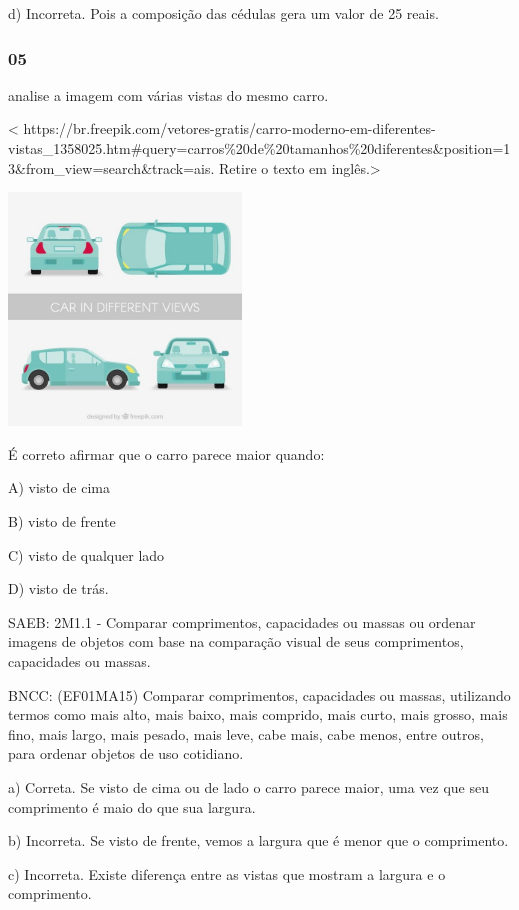 d) Incorreta. Pois a composição das cédulas gera um valor de 25 reais.

\subsubsection{05}\label{section-121}

analise a imagem com várias vistas do mesmo carro.

\textless{}
https://br.freepik.com/vetores-gratis/carro-moderno-em-diferentes-vistas\_1358025.htm\#query=carros\%20de\%20tamanhos\%20diferentes\&position=13\&from\_view=search\&track=ais.
Retire o texto em inglês.\textgreater{}

\includegraphics[width=2.43750in,height=2.43750in]{media/image146.jpg}

É correto afirmar que o carro parece maior quando:

A) visto de cima

B) visto de frente

C) visto de qualquer lado

D) visto de trás.

SAEB: 2M1.1 - Comparar comprimentos, capacidades ou massas ou ordenar
imagens de objetos com base na comparação visual de seus comprimentos,
capacidades ou massas.

BNCC: (EF01MA15) Comparar comprimentos, capacidades ou massas,
utilizando termos como mais alto, mais baixo, mais comprido, mais curto,
mais grosso, mais fino, mais largo, mais pesado, mais leve, cabe mais,
cabe menos, entre outros, para ordenar objetos de uso cotidiano.

a) Correta. Se visto de cima ou de lado o carro parece maior, uma vez
que seu comprimento é maio do que sua largura.

b) Incorreta. Se visto de frente, vemos a largura que é menor que o
comprimento.

c) Incorreta. Existe diferença entre as vistas que mostram a largura e o
comprimento.

